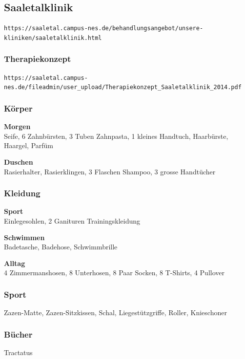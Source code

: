 \documentclass[10pt,a4paper]{article}
\begin{document}
\subsection{Saaletalklinik}

\verb+https://saaletal.campus-nes.de/behandlungsangebot/unsere-kliniken/saaletalklinik.html+


\subsubsection{Therapiekonzept}

\verb+https://saaletal.campus-nes.de/fileadmin/user_upload/Therapiekonzept_Saaletalklinik_2014.pdf+


\subsubsection{Körper}

{\bf Morgen} \\
Seife, 6 Zahnbürsten, 3 Tuben Zahnpasta, 1 kleines Handtuch, Haarbürste, Haargel, Parfüm

\vskip 4pt
{\bf Duschen} \\
Rasierhalter, Rasierklingen, 3 Flaschen Shampoo, 3 grosse Handtücher


\subsubsection{Kleidung}

\vskip 4pt
{\bf Sport} \\
Einlegesohlen, 2 Ganituren Trainingskleidung


\vskip 4pt
{\bf Schwimmen} \\
Badetasche, Badehose, Schwimmbrille

\vskip 4pt
{\bf Alltag} \\
4 Zimmermanshosen, 8 Unterhosen, 8 Paar Socken, 8 T-Shirts, 4 Pullover


\subsubsection{Sport}

Zazen-Matte, Zazen-Sitzkissen, Schal, Liegestützgriffe, Roller, Knieschoner


\subsubsection{Bücher}

Tractatus
\end{document}
